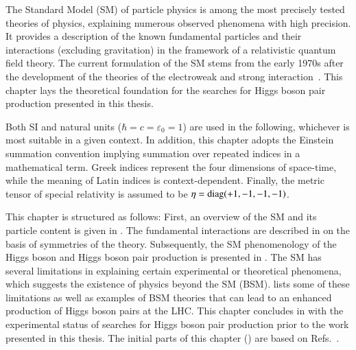 The Standard Model (SM) of particle physics is among the most precisely tested
theories of physics, explaining numerous observed phenomena with high
precision. It provides a description of the known fundamental particles and
their interactions (excluding gravitation) in the framework of a relativistic
quantum field theory. The current formulation of the SM stems from the early
1970s after the development of the theories of the electroweak and strong
interaction~\cite{Glashow:1961tr,Salam:1964ry,Weinberg:1967tq,Englert:1964et,Higgs:1964pj,tHooft:1971qjg,Fritzsch:1973pi,Gross:1973id,Politzer:1973fx}.
This chapter lays the theoretical foundation for the searches for Higgs boson
pair production presented in this thesis.

Both SI and natural units ($\hbar = c = \varepsilon_0 = 1$) are used in the
following, whichever is most suitable in a given context. In addition, this
chapter adopts the Einstein summation convention implying summation over
repeated indices in a mathematical term. Greek indices represent the four
dimensions of space-time, while the meaning of Latin indices is
context-dependent. Finally, the metric tensor of special relativity is assumed
to be $\eta = \operatorname{diag}(+1, -1, -1, -1)$.

This chapter is structured as follows: First, an overview of the SM and its
particle content is given in . The fundamental
interactions are described in  on the
basis of symmetries of the theory. Subsequently, the SM phenomenology of the
Higgs boson and Higgs boson pair production is presented in
. The SM has several limitations in explaining certain
experimental or theoretical phenomena, which suggests the existence of physics
beyond the SM (BSM).  lists some of these limitations as well as
examples of BSM theories that can lead to an enhanced production of Higgs boson
pairs at the LHC. This chapter concludes in  with
the experimental status of searches for Higgs boson pair production prior to the
work presented in this thesis. The initial parts of this chapter
() are based on
Refs.~\cite{Halzen:1984mc,Thomson:2013zua,Djouadi:2005gi}.

